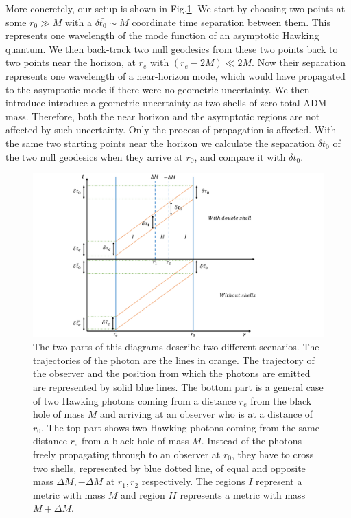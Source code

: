 \documentclass[aps,showpacs,onecolumn,floats,prd,superscriptaddress,nofootinbib]{revtex4-1}
\begin{document}
More concretely, our setup is shown in Fig.\ref{fig-setup}. 
We start by choosing two points at some $r_0\gg M$ with a $\delta \bar{t_0}\sim M$ coordinate time separation between them.
This represents one wavelength of the mode function of an asymptotic Hawking quantum.
We then back-track two null geodesics from these two points back to two points near the horizon, at $r_e$ with $(r_e-2M)\ll 2M$.
Now their separation represents one wavelength of a near-horizon mode, which would have propagated to the asymptotic mode if there were no geometric uncertainty. 
We then introduce introduce a geometric uncertainty as two shells of zero total ADM mass. 
Therefore, both the near horizon and the asymptotic regions are not affected by such uncertainty.
Only the process of propagation is affected.
With the same two starting points near the horizon we calculate the separation $\delta t_0$ of the two null geodesics when they arrive at $r_0$, and compare it with $\delta \bar{t_0}$.

\begin{figure}[tb]
\begin{center}
\includegraphics[scale = 0.6]{Propertime.pdf}
\caption{The two parts of this diagrams describe two different scenarios. The trajectories of the photon are the lines in orange. The trajectory of the observer and the position from which the photons are emitted are represented by solid blue lines. The bottom part is a general case of two Hawking photons coming from a distance $r_e$ from the black hole of mass $M$ and arriving at an observer who is at a distance of $r_0$. The top part shows two Hawking photons coming from the same distance $r_e$ from a black hole of mass $M$. Instead of the photons freely propagating through to an observer at $r_0$, they have to cross two shells, represented by blue dotted line, of equal and opposite mass $\Delta M, -\Delta M$ at $r_{1}, r_{2}$ respectively. The regions $I$ represent a metric with mass $M$ and region $II$ represents a metric with mass $M+\Delta M$.}
\label{fig-setup}
\end{center}
\end{figure}
\end{document}
